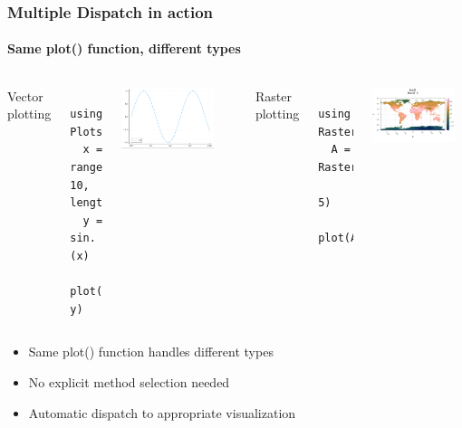 \documentclass[aspectratio=169]{beamer} %
\begin{document}
\begin{frame}[fragile]
    \frametitle{Multiple Dispatch in action}
    \framesubtitle{Same plot() function, different types}
    
    \begin{columns}[t]
        Vector plotting
        \begin{verbatim}
  using Plots
  x = range(0, 10, length=100)
  y = sin.(x)
  plot(x, y) 
        \end{verbatim}
        \includegraphics[width=0.8\textwidth]{sin_plot.png}
        
        Raster plotting
        \begin{verbatim}
  using Rasters
  A = Raster(WorldClim{BioClim},
             5)
  plot(A) 
        \end{verbatim}
        \includegraphics[width=0.9\textwidth]{raster_plot.png}
    \end{columns}
    
    \vspace{0.2cm}
    \begin{itemize}
        \item Same plot() function handles different types
        \item No explicit method selection needed
        \item Automatic dispatch to appropriate visualization
    \end{itemize}
\end{frame}
\end{document}
